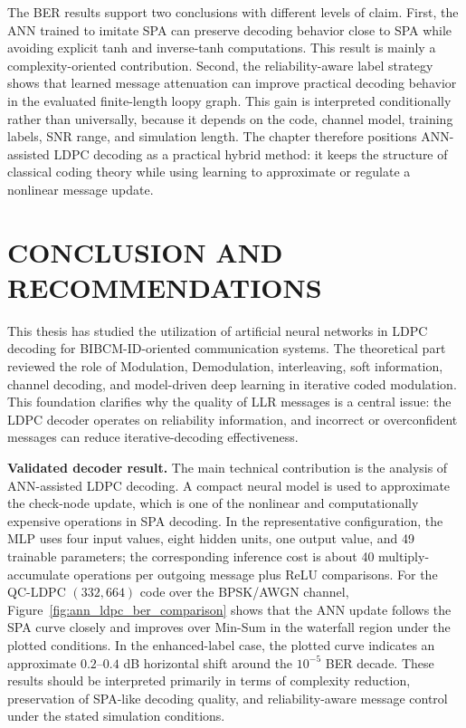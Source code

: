 The BER results support two conclusions with different levels of claim. First, the ANN trained to imitate SPA can preserve decoding behavior close to SPA while avoiding explicit tanh and inverse-tanh computations. This result is mainly a complexity-oriented contribution. Second, the reliability-aware label strategy shows that learned message attenuation can improve practical decoding behavior in the evaluated finite-length loopy graph. This gain is interpreted conditionally rather than universally, because it depends on the code, channel model, training labels, SNR range, and simulation length. The chapter therefore positions ANN-assisted LDPC decoding as a practical hybrid method: it keeps the structure of classical coding theory while using learning to approximate or regulate a nonlinear message update.

\chapter*{CONCLUSION AND RECOMMENDATIONS}
This thesis has studied the utilization of artificial neural networks in LDPC decoding for BIBCM-ID-oriented communication systems. The theoretical part reviewed the role of Modulation, Demodulation, interleaving, soft information, channel decoding, and model-driven deep learning in iterative coded modulation. This foundation clarifies why the quality of LLR messages is a central issue: the LDPC decoder operates on reliability information, and incorrect or overconfident messages can reduce iterative-decoding effectiveness.

\noindent\textbf{Validated decoder result.} The main technical contribution is the analysis of ANN-assisted LDPC decoding. A compact neural model is used to approximate the check-node update, which is one of the nonlinear and computationally expensive operations in SPA decoding. In the representative configuration, the MLP uses four input values, eight hidden units, one output value, and 49 trainable parameters; the corresponding inference cost is about 40 multiply-accumulate operations per outgoing message plus ReLU comparisons. For the QC-LDPC $(332,664)$ code over the BPSK/AWGN channel, Figure~\ref{fig:ann_ldpc_ber_comparison} shows that the ANN update follows the SPA curve closely and improves over Min-Sum in the waterfall region under the plotted conditions. In the enhanced-label case, the plotted curve indicates an approximate $0.2$--$0.4$ dB horizontal shift around the $10^{-5}$ BER decade. These results should be interpreted primarily in terms of complexity reduction, preservation of SPA-like decoding quality, and reliability-aware message control under the stated simulation conditions.

